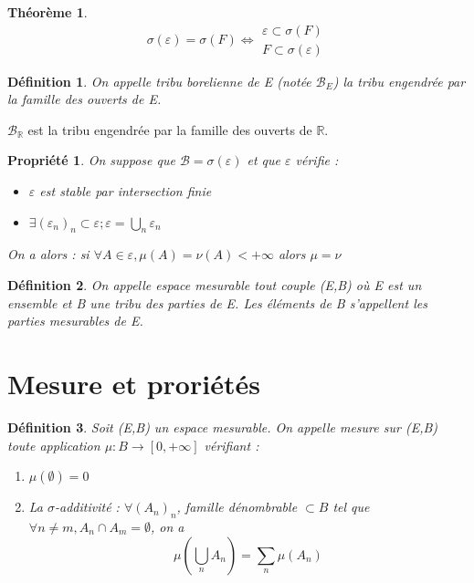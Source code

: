 \documentclass{article}
\theoremstyle{mes_theoremes}
\newtheorem{theo}{Théorème}[section]
\newtheorem*{Def}{Définition}
\newtheorem{prop}{Propriété}[section]
\begin{document}
\bigskip
\begin{theo}
\[\sigma(\varepsilon)=\sigma(F) \Leftrightarrow \begin{array}{l} \varepsilon \subset \sigma(F) \\ F \subset \sigma(\varepsilon) \end{array}\]
\end{theo}


\begin{Def}
On appelle tribu borelienne de E (notée $\mathcal{B}_E$) la tribu engendrée par la famille des ouverts de E.
\end{Def}
$\mathcal{B}_{\mathbb{R}}$ est la tribu engendrée par la famille des ouverts de $\mathbb{R}$.

\bigskip
\begin{prop}
On suppose que $\mathcal{B}=\sigma(\varepsilon)$ et que $\varepsilon$ vérifie :
\begin{itemize}
\item $\varepsilon$ est stable par intersection finie
\item $\exists (\varepsilon_n)_n \subset \varepsilon; \varepsilon=\bigcup_n \varepsilon_n$
\end{itemize}
On a alors : si $\forall A \in \varepsilon, \mu(A)=\nu(A)<+\infty$ alors $\mu=\nu$
\end{prop}

\bigskip
\begin{Def}
On appelle espace mesurable tout couple (E,B) où E est un ensemble et B une tribu des parties de E. Les éléments de B s'appellent les parties mesurables de E.
\end{Def}

\newpage

\section{Mesure et proriétés}
\begin{Def}
Soit (E,B) un espace mesurable. On appelle mesure sur (E,B) toute application $\mu : B\rightarrow[0,+\infty]$ vérifiant :
\begin{enumerate}
\item $\mu(\emptyset)=0$
\item La $\sigma$-additivité : $\forall (A_n)_n$, famille dénombrable $\subset B$ tel que $\forall n \neq m, A_n \cap A_m = \emptyset$, on a \[\mu(\bigcup_n A_n)=\sum_n \mu(A_n)\]
\end{enumerate}
\end{Def}
\end{document}
